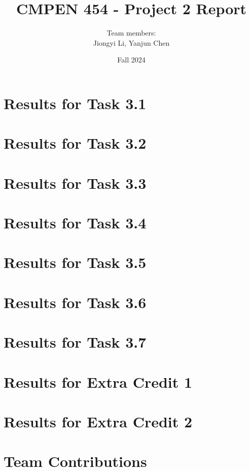 \documentclass{article}
\title{CMPEN 454 - Project 2 Report}
\author{Team members: \\ Jiongyi Li, Yanjun Chen}
\date{Fall 2024}
\begin{document}
\maketitle

\section{Results for Task 3.1}

\section{Results for Task 3.2}

\section{Results for Task 3.3}

\section{Results for Task 3.4}

\section{Results for Task 3.5}

\section{Results for Task 3.6}

\section{Results for Task 3.7}

\section{Results for Extra Credit 1}

\section{Results for Extra Credit 2}

\section{Team Contributions}
\end{document}
